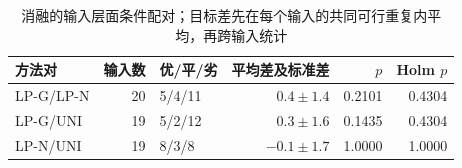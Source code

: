 \begin{table}[htbp]
\centering\footnotesize
\caption{消融的输入层面条件配对；目标差先在每个输入的共同可行重复内平均，再跨输入统计}\label{tab:extra-paired}
\begin{tabular}{lrlrrr}\toprule
方法对 & 输入数 & 优/平/劣 & 平均差及标准差 & $p$ & Holm $p$ \\\midrule
LP-G/LP-N & 20 & 5/4/11 & $0.4\pm1.4$ & 0.2101 & 0.4304 \\
LP-G/UNI & 19 & 5/2/12 & $0.3\pm1.6$ & 0.1435 & 0.4304 \\
LP-N/UNI & 19 & 8/3/8 & $-0.1\pm1.7$ & 1.0000 & 1.0000 \\
\bottomrule\end{tabular}
\end{table}
